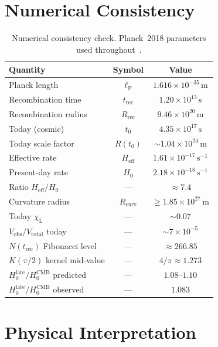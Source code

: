 \documentclass[12pt,a4paper]{amsart}
\theoremstyle{plain}
\theoremstyle{definition}
\theoremstyle{remark}
\newcommand{\lP}{\ell_{\mathrm{P}}}
\newcommand{\Hzero}{H_0}
\newcommand{\Heff}{H_{\mathrm{eff}}}
\newcommand{\trec}{t_{\mathrm{rec}}}
\newcommand{\Rrec}{R_{\mathrm{rec}}}
\newcommand{\Vtot}{V_{\mathrm{total}}}
\newcommand{\Vobs}{V_{\mathrm{obs}}}
\newcommand{\chiL}{\chi_{\mathrm{L}}}
\begin{document}
\section{Numerical Consistency}
\label{sec:numerics}

\begin{table}[h]
\centering
\caption{Numerical consistency check. Planck~2018 parameters
  used throughout~\cite{Planck2018}.}
\label{tab:numerics}
\begin{tabular}{lcc}
\toprule
Quantity & Symbol & Value \\
\midrule
Planck length & $\lP$ & $1.616\times 10^{-35}\,\mathrm{m}$ \\
Recombination time & $\trec$ & $1.20\times 10^{13}\,\mathrm{s}$ \\
Recombination radius & $\Rrec$ & $9.46\times 10^{20}\,\mathrm{m}$ \\
Today (cosmic) & $t_0$ & $4.35\times 10^{17}\,\mathrm{s}$ \\
Today scale factor & $R(t_0)$ & $\sim 1.04\times 10^{24}\,\mathrm{m}$ \\
Effective rate & $\Heff$ & $1.61\times 10^{-17}\,\mathrm{s}^{-1}$ \\
Present-day rate & $H_0$ & $2.18\times 10^{-18}\,\mathrm{s}^{-1}$ \\
Ratio $\Heff/H_0$ & --- & $\approx 7.4$ \\
Curvature radius & $R_{\mathrm{curv}}$ & $\geq 1.85\times 10^{27}\,\mathrm{m}$ \\
Today $\chiL$ & --- & $\sim 0.07$ \\
$\Vobs/\Vtot$ today & --- & $\sim 7\times 10^{-5}$ \\
$N(\trec)$ Fibonacci level & --- & $\approx 266.85$ \\
$K(\pi/2)$ kernel mid-value & --- & $4/\pi\approx 1.273$ \\
$\Hzero^{\mathrm{late}}/\Hzero^{\mathrm{CMB}}$ predicted & --- & $1.08$--$1.10$ \\
$\Hzero^{\mathrm{late}}/\Hzero^{\mathrm{CMB}}$ observed & --- & $1.083$ \\
\bottomrule
\end{tabular}
\end{table}

\section{Physical Interpretation}
\label{sec:interp}
\end{document}

